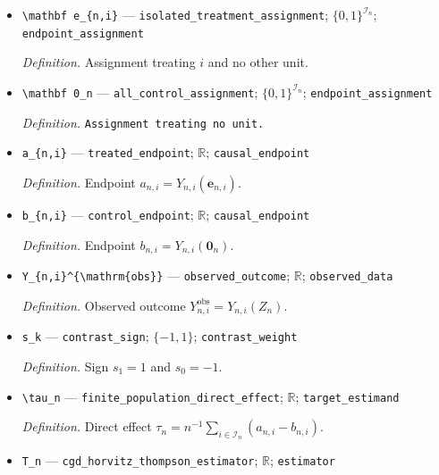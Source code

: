 \documentclass{article}
\begin{document}
\begin{itemize}
  \item \texttt{\textbackslash{}\allowbreak{}mathbf e\_\allowbreak{}\{n,\allowbreak{}i\}\allowbreak{}} --- \texttt{isolated\_\allowbreak{}treatment\_\allowbreak{}assignment}; \(\{0,1\}^{\mathcal I_n}\); \texttt{endpoint\_\allowbreak{}assignment}
  \par\smallskip\noindent\emph{Definition.} Assignment treating \(i\) and no other unit.
  \item \texttt{\textbackslash{}\allowbreak{}mathbf 0\_\allowbreak{}n} --- \texttt{all\_\allowbreak{}control\_\allowbreak{}assignment}; \(\{0,1\}^{\mathcal I_n}\); \texttt{endpoint\_\allowbreak{}assignment}
  \par\smallskip\noindent\emph{Definition.} \texttt{Assignment treating no unit.}
  \item \texttt{a\_\allowbreak{}\{n,\allowbreak{}i\}\allowbreak{}} --- \texttt{treated\_\allowbreak{}endpoint}; \(\mathbb R\); \texttt{causal\_\allowbreak{}endpoint}
  \par\smallskip\noindent\emph{Definition.} Endpoint \(a_{n,i}=Y_{n,i}(\mathbf e_{n,i})\).
  \item \texttt{b\_\allowbreak{}\{n,\allowbreak{}i\}\allowbreak{}} --- \texttt{control\_\allowbreak{}endpoint}; \(\mathbb R\); \texttt{causal\_\allowbreak{}endpoint}
  \par\smallskip\noindent\emph{Definition.} Endpoint \(b_{n,i}=Y_{n,i}(\mathbf 0_n)\).
  \item \texttt{Y\_\allowbreak{}\{n,\allowbreak{}i\}\allowbreak{}\textasciicircum{}\{\textbackslash{}\allowbreak{}mathrm\{obs\}\allowbreak{}\}\allowbreak{}} --- \texttt{observed\_\allowbreak{}outcome}; \(\mathbb R\); \texttt{observed\_\allowbreak{}data}
  \par\smallskip\noindent\emph{Definition.} Observed outcome \(Y_{n,i}^{\mathrm{obs}}=Y_{n,i}(Z_n)\).
  \item \texttt{s\_\allowbreak{}k} --- \texttt{contrast\_\allowbreak{}sign}; \(\{-1,1\}\); \texttt{contrast\_\allowbreak{}weight}
  \par\smallskip\noindent\emph{Definition.} Sign \(s_1=1\) and \(s_0=-1\).
  \item \texttt{\textbackslash{}\allowbreak{}tau\_\allowbreak{}n} --- \texttt{finite\_\allowbreak{}population\_\allowbreak{}direct\_\allowbreak{}effect}; \(\mathbb R\); \texttt{target\_\allowbreak{}estimand}
  \par\smallskip\noindent\emph{Definition.} Direct effect \(\tau_n=n^{-1}\sum_{i\in\mathcal I_n}(a_{n,i}-b_{n,i})\).
  \item \texttt{T\_\allowbreak{}n} --- \texttt{cgd\_\allowbreak{}horvitz\_\allowbreak{}thompson\_\allowbreak{}estimator}; \(\mathbb R\); \texttt{estimator}

\end{itemize}
\end{document}
